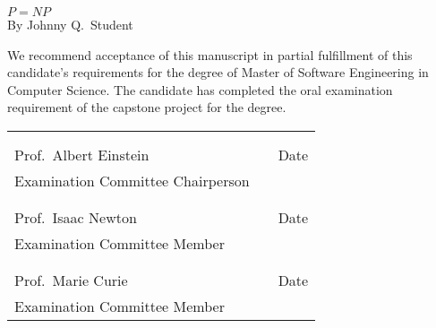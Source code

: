 \thispagestyle{empty}
\vspace*{0.3in}
\begin{center}
	\large{\textbf{\(P = NP\)}} \\ 
	\vspace{0.75in}
	\normalsize{By Johnny Q.\ Student}
\end{center}

\vspace{0.5in}
\noindent We recommend acceptance of this manuscript in partial fulfillment of this candidate's requirements for the degree of Master of Software Engineering in Computer Science. The candidate has completed the oral examination requirement of the capstone project for the degree. \\

\noindent
\begin{tabularx}{\textwidth}{p{3in}Xp{2in}}
	\rule{0pt}{50pt} & & \\
	\hrulefill & & \hrulefill \\
	Prof.\ Albert Einstein & & Date \\
	Examination Committee Chairperson & & \\
	\rule{0pt}{50pt} & & \\
	\hrulefill & & \hrulefill \\
	Prof.\ Isaac Newton & & Date \\
	Examination Committee Member & & \\
	\rule{0pt}{50pt} & & \\
	\hrulefill & & \hrulefill \\
	Prof.\ Marie Curie & & Date \\
	Examination Committee Member & & \\
\end{tabularx}

